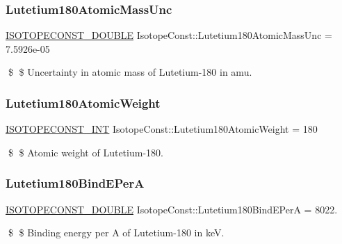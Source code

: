 \subsubsection{\texorpdfstring{Lutetium180\+Atomic\+Mass\+Unc}{Lutetium180AtomicMassUnc}}
{\footnotesize\ttfamily \mbox{\hyperlink{group___isotope_const-_macros_ga8f45a7272ce02c0b4c65c44636ed719a}{I\+S\+O\+T\+O\+P\+E\+C\+O\+N\+S\+T\+\_\+\+D\+O\+U\+B\+LE}} Isotope\+Const\+::\+Lutetium180\+Atomic\+Mass\+Unc = 7.\+5926e-\/05}

\$ \$ Uncertainty in atomic mass of Lutetium-\/180 in amu. \mbox{\label{group___isotope_const-_lutetium-_lu180_ga00649e779aa16e66dd76d8bcc233fd48}} 
\subsubsection{\texorpdfstring{Lutetium180\+Atomic\+Weight}{Lutetium180AtomicWeight}}
{\footnotesize\ttfamily \mbox{\hyperlink{group___isotope_const-_macros_ga5f18360b3e99483a35c32d789e62621c}{I\+S\+O\+T\+O\+P\+E\+C\+O\+N\+S\+T\+\_\+\+I\+NT}} Isotope\+Const\+::\+Lutetium180\+Atomic\+Weight = 180}

\$ \$ Atomic weight of Lutetium-\/180. \mbox{\label{group___isotope_const-_lutetium-_lu180_ga00e690154aeff1852bdb0e66efc11f7e}} 
\subsubsection{\texorpdfstring{Lutetium180\+Bind\+E\+PerA}{Lutetium180BindEPerA}}
{\footnotesize\ttfamily \mbox{\hyperlink{group___isotope_const-_macros_ga8f45a7272ce02c0b4c65c44636ed719a}{I\+S\+O\+T\+O\+P\+E\+C\+O\+N\+S\+T\+\_\+\+D\+O\+U\+B\+LE}} Isotope\+Const\+::\+Lutetium180\+Bind\+E\+PerA = 8022.}

\$ \$ Binding energy per A of Lutetium-\/180 in keV. \mbox{\label{group___isotope_const-_lutetium-_lu180_ga9064bddfff41dabbdac02380ba94262e}} 
